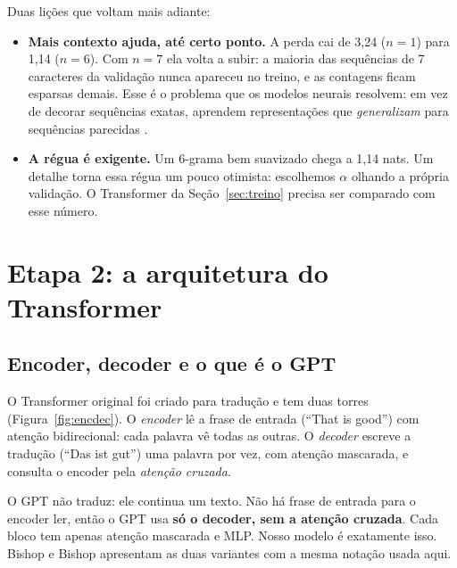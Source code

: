 \documentclass[11pt,a4paper]{article}
\begin{document}
Duas lições que voltam mais adiante:
\begin{itemize}
\item \textbf{Mais contexto ajuda, até certo ponto.} A perda cai de 3,24 ($n=1$) para 1,14 ($n=6$). Com $n=7$ ela volta a subir: a maioria das sequências de 7 caracteres da validação nunca apareceu no treino, e as contagens ficam esparsas demais. Esse é o problema que os modelos neurais resolvem: em vez de decorar sequências exatas, aprendem representações que \emph{generalizam} para sequências parecidas \cite{bengio2003}.
\item \textbf{A régua é exigente.} Um 6-grama bem suavizado chega a 1,14 nats. Um detalhe torna essa régua um pouco otimista: escolhemos $\alpha$ olhando a própria validação. O Transformer da Seção~\ref{sec:treino} precisa ser comparado com esse número.
\end{itemize}

\section{Etapa 2: a arquitetura do Transformer}
\label{sec:arquitetura}

\subsection{Encoder, decoder e o que é o GPT}

O Transformer original \cite{vaswani} foi criado para tradução e tem duas torres (Figura~\ref{fig:encdec}). O \emph{encoder} lê a frase de entrada (``That is good'') com atenção bidirecional: cada palavra vê todas as outras. O \emph{decoder} escreve a tradução (``Das ist gut'') uma palavra por vez, com atenção mascarada, e consulta o encoder pela \emph{atenção cruzada}.

O GPT \cite{radford2019} não traduz: ele continua um texto. Não há frase de entrada para o encoder ler, então o GPT usa \textbf{só o decoder, sem a atenção cruzada}. Cada bloco tem apenas atenção mascarada e MLP. Nosso modelo é exatamente isso. Bishop e Bishop \cite[cap.~12]{bishop} apresentam as duas variantes com a mesma notação usada aqui.
\end{document}
